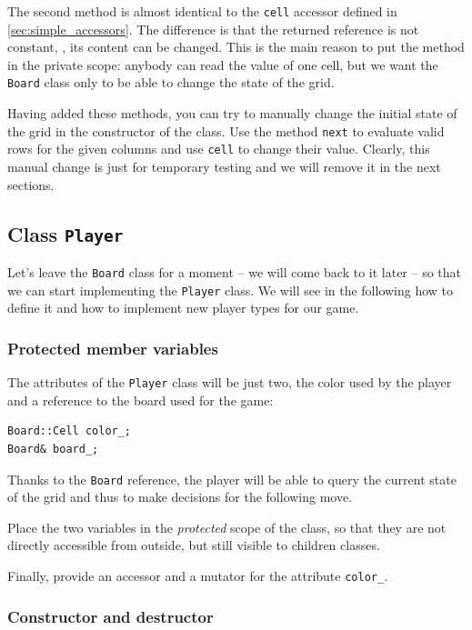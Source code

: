 \documentclass{article}
\begin{document}
The second method is almost identical to the \texttt{cell} accessor defined in \cref{sec:simple_accessors}. The difference is that the returned reference is not constant, \ie, its content can be changed. This is the main reason to put the method in the private scope: anybody can read the value of one cell, but we want the \texttt{Board} class only to be able to change the state of the grid.

Having added these methods, you can try to manually change the initial state of the grid in the constructor of the class. Use the method \texttt{next} to evaluate valid rows for the given columns and use \texttt{cell} to change their value. Clearly, this manual change is just for temporary testing and we will remove it in the next sections.




\subsection{Class \texttt{Player}}

Let's leave the \texttt{Board} class for a moment -- we will come back to it later -- so that we can start implementing the \texttt{Player} class. We will see in the following how to define it and how to implement new player types for our game.


\subsubsection{Protected member variables}

The attributes of the \texttt{Player} class will be just two, the color used by the player and a reference to the board used for the game:
\begin{lstlisting}[style=mycpp,numbers=none]
Board::Cell color_;
Board& board_;
\end{lstlisting}
Thanks to the \texttt{Board} reference, the player will be able to query the current state of the grid and thus to make decisions for the following move.

Place the two variables in the \emph{protected} scope of the class, so that they are not directly accessible from outside, but still visible to children classes.

Finally, provide an accessor and a mutator for the attribute \texttt{color\string_}.


\subsubsection{Constructor and destructor}
\end{document}
